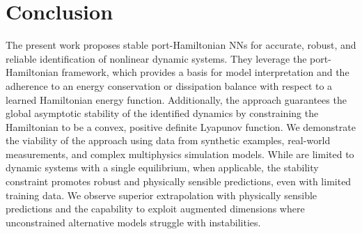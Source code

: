 \section{Conclusion}\label{sec:conclusion}

The present work proposes stable port-Hamiltonian NNs for accurate, robust, and reliable identification of nonlinear dynamic systems.
They leverage the port-Hamiltonian framework, which provides a basis for model interpretation and the adherence to an energy conservation or dissipation balance with respect to a learned Hamiltonian energy function.
Additionally, the approach guarantees the global asymptotic stability of the identified dynamics by constraining the Hamiltonian to be a convex, positive definite Lyapunov function.
We demonstrate the viability of the approach using data from synthetic examples, real-world measurements, and complex multiphysics simulation models. 
While \sPHNNs are limited to dynamic systems with a single equilibrium, when applicable, the stability constraint promotes robust and physically sensible predictions, even with limited training data. 
We observe superior extrapolation with physically sensible predictions and the capability to exploit augmented dimensions where unconstrained alternative models struggle with instabilities.

